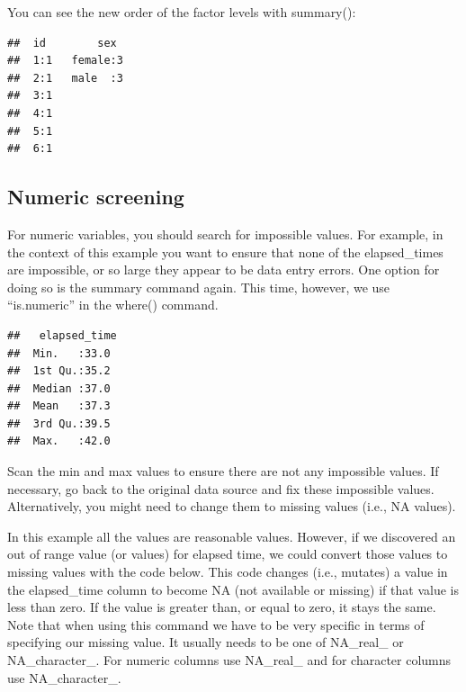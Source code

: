 \documentclass[
]{krantz}
\makeatletter
\newenvironment{Shaded}{\begin{snugshade}}{\end{snugshade}}
\newcommand{\KeywordTok}[1]{\textcolor[rgb]{0.27,0.27,0.27}{\textbf{#1}}}
\newcommand{\NormalTok}[1]{#1}
\newcommand{\OperatorTok}[1]{\textcolor[rgb]{0.43,0.43,0.43}{\textbf{#1}}}
\newcommand{\StringTok}[1]{\textcolor[rgb]{0.5,0.5,0.5}{#1}}
\newenvironment{kframe}{%
\medskip{}
\setlength{\fboxsep}{.8em}
 \def\at@end@of@kframe{}%
 \ifinner\ifhmode%
  \def\at@end@of@kframe{\end{minipage}}%
  \begin{minipage}{\columnwidth}%
 \fi\fi%
 \def\FrameCommand##1{\hskip\@totalleftmargin \hskip-\fboxsep
 \colorbox{shadecolor}{##1}\hskip-\fboxsep
     \hskip-\linewidth \hskip-\@totalleftmargin \hskip\columnwidth}%
 \MakeFramed {\advance\hsize-\width
   \@totalleftmargin\z@ \linewidth\hsize
   \@setminipage}}%
 {\par\unskip\endMakeFramed%
 \at@end@of@kframe}
\renewenvironment{Shaded}{\begin{kframe}}{\end{kframe}}
\makeatother
\begin{document}
You can see the new order of the factor levels with summary():

\begin{Shaded}
\end{Shaded}

\begin{verbatim}
##  id        sex   
##  1:1   female:3  
##  2:1   male  :3  
##  3:1             
##  4:1             
##  5:1             
##  6:1
\end{verbatim}

\hypertarget{numeric-screening}{%
\subsection{Numeric screening}\label{numeric-screening}}

For numeric variables, you should search for impossible values. For example, in the context of this example you want to ensure that none of the elapsed\_times are impossible, or so large they appear to be data entry errors. One option for doing so is the summary command again. This time, however, we use ``is.numeric'' in the where() command.

\begin{Shaded}
\end{Shaded}

\begin{verbatim}
##   elapsed_time 
##  Min.   :33.0  
##  1st Qu.:35.2  
##  Median :37.0  
##  Mean   :37.3  
##  3rd Qu.:39.5  
##  Max.   :42.0
\end{verbatim}

Scan the min and max values to ensure there are not any impossible values. If necessary, go back to the original data source and fix these impossible values. Alternatively, you might need to change them to missing values (i.e., NA values).

In this example all the values are reasonable values. However, if we discovered an out of range value (or values) for elapsed time, we could convert those values to missing values with the code below. This code changes (i.e., mutates) a value in the elapsed\_time column to become NA (not available or missing) if that value is less than zero. If the value is greater than, or equal to zero, it stays the same. Note that when using this command we have to be very specific in terms of specifying our missing value. It usually needs to be one of NA\_real\_ or NA\_character\_. For numeric columns use NA\_real\_ and for character columns use NA\_character\_.
\end{document}
